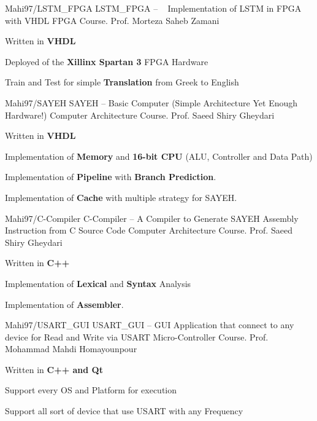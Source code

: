 \begin{cventries}
    
    \cventry
    {Mahi97/LSTM\_FPGA} %
    {LSTM\_FPGA -- ~ Implementation of LSTM in FPGA with VHDL} %
    {FPGA Course.} %
    {Prof. Morteza Saheb Zamani} %
    {
      \begin{cvitems} %
        \item {Written in \textbf{VHDL}}
        \item {Deployed of the \textbf{Xillinx Spartan 3} FPGA Hardware}
        \item {Train and Test for simple \textbf{Translation} from Greek to English}
      \end{cvitems}
    }

    \cventry
    {Mahi97/SAYEH} %
    {SAYEH -- Basic Computer (Simple Architecture Yet Enough Hardware!)} %
    {Computer Architecture Course.} %
    {Prof. Saeed Shiry Gheydari} %
    {
      \begin{cvitems} %
        \item {Written in \textbf{VHDL}}
        \item {Implementation of \textbf{Memory} and \textbf{16-bit CPU} (ALU, Controller and Data Path)}
        \item {Implementation of \textbf{Pipeline} with \textbf{Branch Prediction}.}
        \item {Implementation of \textbf{Cache} with multiple strategy for SAYEH.}
      \end{cvitems}
    }
    
    \cventry
    {Mahi97/C-Compiler} %
    {C-Compiler -- A Compiler to Generate SAYEH Assembly Instruction from C Source Code} %
    {Computer Architecture Course.} %
    {Prof. Saeed Shiry Gheydari} %
    {
      \begin{cvitems} %
        \item {Written in \textbf{C++}}
        \item {Implementation of \textbf{Lexical} and \textbf{Syntax} Analysis}
        \item {Implementation of \textbf{Assembler}.}
      \end{cvitems}
    }
    
 

    
    \cventry
    {Mahi97/USART\_GUI} %
    {USART\_GUI -- GUI Application that connect to any device for Read and Write via USART} %
    {Micro-Controller Course.} %
    {Prof. Mohammad Mahdi Homayounpour} %
    {
      \begin{cvitems} %
        \item {Written in \textbf{C++ and Qt}}
        \item {Support every OS and Platform for execution}
        \item {Support all sort of device that use USART with any Frequency}
      \end{cvitems}
    }


\end{cventries}
